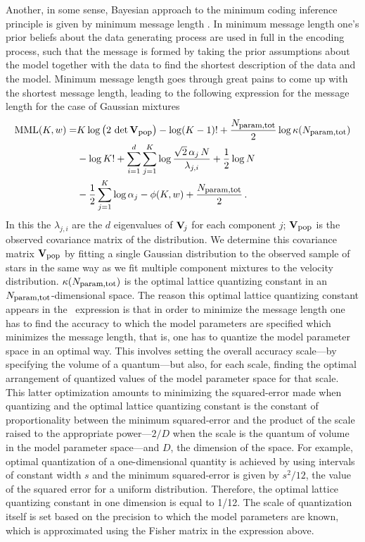 Another, in some sense, Bayesian approach to the minimum coding inference
principle is given by minimum message length
\citep[\MML;][]{wallace68a,wallacebook}. In minimum message length
one's prior beliefs about the data generating process are used in full
in the encoding process, such that the message is formed by taking the
prior assumptions about the model together with the data to find the
shortest description of the data and the model. Minimum message length
goes through great pains to come up with the shortest message length,
leading to the following expression for the message length for the
case of Gaussian mixtures \citep{wallace87a,oliver94a,Oliver96a}
\begin{equation}\label{eq:mml}
\begin{split}
\mathrm{MML}(K,w) = & K \log\left(2\,\det \mathbf{V}_{\mbox{{\footnotesize pop}}}\right)
-\log(K-1)! +\frac{N_{\mbox{{\footnotesize param,tot}}}}{2}\log\kappa(N_{\mbox{{\footnotesize param,tot}}})\\
& - \log K! + \sum_{i=1}^{d}\sum_{j=1}^K \log \frac{\sqrt{2}\,\alpha_j\,N}{\lambda_{j,i}}+
\frac{1}{2}\log N \\
& -\frac{1}{2}\sum_{j=1}^K \log \alpha_j -
\phi(K,w) +\frac{N_{\mbox{{\footnotesize param,tot}}}}{2}\, .
\end{split}
\end{equation}
In this the $\lambda_{j,i}$ are the $d$ eigenvalues of $\mathbf{V}_{\!j}$ for each
component $j$; $\mathbf{V}_{\mbox{{\footnotesize pop}}}$ is the observed
covariance matrix of the distribution. We determine this covariance
matrix $\mathbf{V}_{\mbox{{\footnotesize pop}}}$ by fitting a single Gaussian
distribution to the observed sample of stars in the same way as we fit
multiple component mixtures to the velocity
distribution. $\kappa(N_{\mbox{{\footnotesize param,tot}}})$ is the optimal lattice quantizing
constant in an $N_{\mbox{{\footnotesize param,tot}}}$-dimensional space. The reason this
optimal lattice quantizing constant appears in the \MML\ expression is
that in order to minimize the message length one has to find the
accuracy to which the model parameters are specified which minimizes
the message length, that is, one has to quantize the model parameter
space in an optimal way. This involves setting the overall accuracy
scale---by specifying the volume of a quantum---but also, for each
scale, finding the optimal arrangement of quantized values of the
model parameter space for that scale. This latter optimization amounts
to minimizing the squared-error made when quantizing and the optimal
lattice quantizing constant is the constant of proportionality between
the minimum squared-error and the product of the scale raised to the
appropriate power---$2/D$ when the scale is the quantum of volume in
the model parameter space---and $D$, the dimension of the space. For
example, optimal quantization of a one-dimensional quantity is
achieved by using intervals of constant width $s$ and the minimum
squared-error is given by $s^2/12$, the value of the squared error for
a uniform distribution. Therefore, the optimal lattice quantizing
constant in one dimension is equal to 1/12. The scale of quantization
itself is set based on the precision to which the model parameters are
known, which is approximated using the Fisher matrix in the expression
above.

